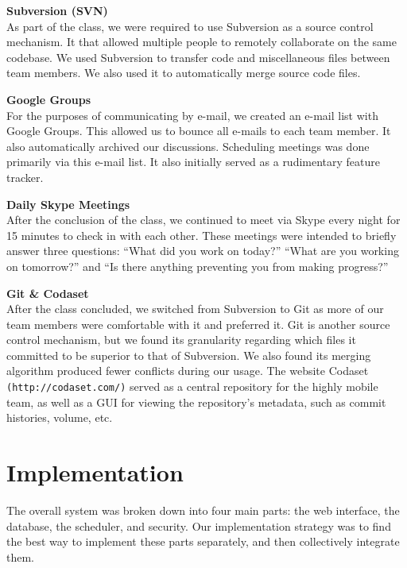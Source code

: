 \documentclass[12pt]{article}
\begin{document}
\begin{description}
\item{\textbf{Subversion (SVN)}} \\As part of the class, we were required to use Subversion as a source control mechanism. It that allowed multiple people to remotely collaborate on the same codebase. We used Subversion to transfer code and miscellaneous files between team members. We also used it to automatically merge source code files.
\item{\textbf{Google Groups}} \\For the purposes of communicating by e-mail, we created an e-mail list with Google Groups. This allowed us to bounce all e-mails to each team member. It also automatically archived our discussions. Scheduling meetings was done primarily via this e-mail list. It also initially served as a rudimentary feature tracker.
\item{\textbf{Daily Skype Meetings}} \\After the conclusion of the class, we continued to meet via Skype every night for 15 minutes to check in with each other. These meetings were intended to briefly answer three questions: ``What did you work on today?'' ``What are you working on tomorrow?'' and ``Is there anything preventing you from making progress?''
\item{\textbf{Git \& Codaset}} \\After the class concluded, we switched from Subversion to Git as more of our team members were comfortable with it and preferred it. Git is another source control mechanism, but we found its granularity regarding which files it committed to be superior to that of Subversion. We also found its merging algorithm produced fewer conflicts during our usage. The website Codaset \texttt{(http://codaset.com/)} served as a central repository for the highly mobile team, as well as a GUI for viewing the repository's metadata, such as commit histories, volume, etc.
\end{description}

\section{Implementation} %

The overall system was broken down into four main parts: the web interface, the database, the scheduler, and security. Our implementation strategy was to find the best way to implement these parts separately, and then collectively integrate them.
\end{document}

